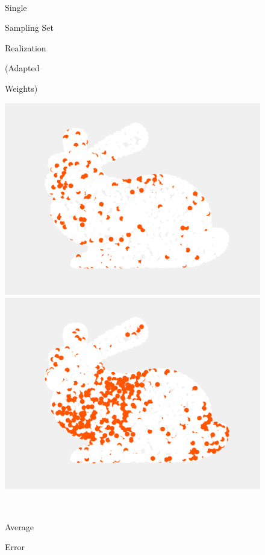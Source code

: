 \documentclass[journal, 10pt]{IEEEtran}
\begin{document}
{\begin{figure}[H]
\begin{minipage}[m]{0.4\linewidth}
\end{minipage} \\
\begin{minipage}[m]{0.16\linewidth}
\centerline{\small{Single}}
\centerline{\small{Sampling Set}}
\centerline{\small{Realization}}
\centerline{\small{(Adapted}}
\centerline{\small{Weights)}}
\end{minipage}
\begin{minipage}[m]{0.4\linewidth}
\centerline{\includegraphics[width=.85\linewidth]{fig_rec_low_selected_adapted}}
\end{minipage}
\begin{minipage}[m]{0.4\linewidth}
\centerline{\includegraphics[width=.85\linewidth]{fig_rec_band_selected_adapted}}
\end{minipage} \\
\begin{minipage}[m]{0.16\linewidth}
\centerline{\small{Average}}
\centerline{\small{Error}}
\end{minipage}

\end{figure}}
\end{document}
